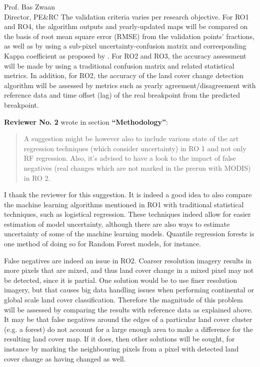 \documentclass[a4paper,10pt,backaddress=false]{scrartcl}
\begin{document}
\begin{letter}{Prof. Bas Zwaan \\ Director, PE\&RC}
The validation criteria varies per research objective. For RO1 and RO4, the algorithm outputs and yearly-updated maps will be compared on the basis of root mean square error (RMSE) from the validation points' fractions, as well as by using a sub-pixel uncertainty-confusion matrix and corresponding Kappa coefficient as proposed by \citet{silvan-cardenas_sub-pixel_2008}. For RO2 and RO3, the accuracy assessment will be made by using a traditional confusion matrix and related statistical metrics. In addition, for RO2, the accuracy of the land cover change detection algorithm will be assessed by metrics such as yearly agreement/disagreement with reference data and time offset (lag) of the real breakpoint from the predicted breakpoint.

\bigskip

\textbf{Reviewer No. 2} wrote in section \textbf{``Methodology''}:

\blockquote{A suggestion might be however also to include various state of the art regression techniques (which consider uncertainty) in RO 1 and not only RF regression. Also, it’s advised to have a look to the impact of false negatives (real changes which are not marked in the prerun with MODIS) in RO 2.}

I thank the reviewer for this suggestion. It is indeed a good idea to also compare the machine learning algorithms mentioned in RO1 with traditional statistical techniques, such as logistical regression. These techniques indeed allow for easier estimation of model uncertainty, although there are also ways to estimate uncertainty of some of the machine learning models. Quantile regression forests \citep{meinshausen_quantile_2006} is one method of doing so for Random Forest models, for instance.

False negatives are indeed an issue in RO2. Coarser resolution imagery results in more pixels that are mixed, and thus land cover change in a mixed pixel may not be detected, since it is partial. One solution would be to use finer resolution imagery, but that causes big data handling issues when performing continental or global scale land cover classification. Therefore the magnitude of this problem will be assessed by comparing the results with reference data as explained above. It may be that false negatives around the edges of a particular land cover cluster (e.g. a forest) do not account for a large enough area to make a difference for the resulting land cover map. If it does, then other solutions will be sought, for instance by marking the neighbouring pixels from a pixel with detected land cover change as having changed as well.


\end{letter}
\end{document}
